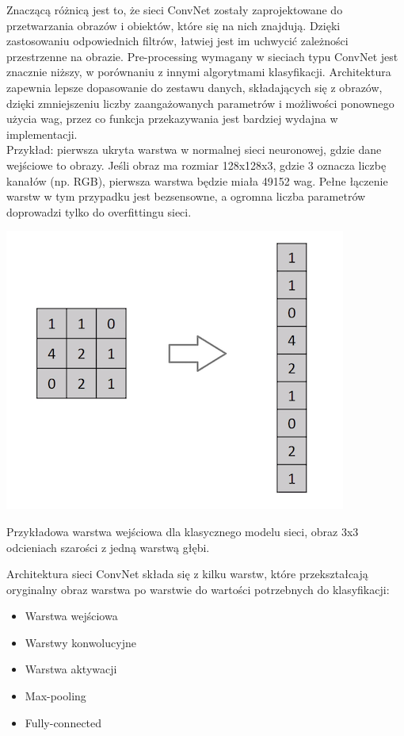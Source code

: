 \documentclass[12pt,a4paper]{article}
\begin{document}
    Znaczącą różnicą jest to, że sieci ConvNet zostały zaprojektowane do przetwarzania obrazów i obiektów, które się na nich znajdują. Dzięki zastosowaniu odpowiednich filtrów, łatwiej jest im uchwycić zależności przestrzenne na obrazie. Pre-processing wymagany w sieciach typu ConvNet jest znacznie niższy, w porównaniu z innymi algorytmami klasyfikacji. Architektura zapewnia lepsze dopasowanie do zestawu danych, składających się z obrazów, dzięki zmniejszeniu liczby zaangażowanych parametrów i możliwości ponownego użycia wag, przez co funkcja przekazywania jest bardziej wydajna w implementacji. 
    \\
    
    Przykład: pierwsza ukryta warstwa w normalnej sieci neuronowej, gdzie dane wejściowe to obrazy. Jeśli obraz ma rozmiar 128x128x3, gdzie 3 oznacza liczbę kanałów (np. RGB), pierwsza warstwa będzie miała 49152 wag. Pełne łączenie warstw w tym przypadku jest bezsensowne, a ogromna liczba parametrów doprowadzi tylko do overfittingu sieci.
    \begin{center}
        \includegraphics[scale=0.5]{input_vector.png}
        \begin{flushright}
            \begin{scriptsize}
            Przykładowa warstwa wejściowa dla klasycznego modelu sieci, obraz 3x3 odcieniach szarości z jedną warstwą głębi.
            \end{scriptsize}
        \end{flushright}
    \end{center}
    
    Architektura sieci ConvNet składa się z kilku warstw, które przekształcają oryginalny obraz warstwa po warstwie do wartości potrzebnych do klasyfikacji:
    \begin{itemize}
        \item Warstwa wejściowa
        \item Warstwy konwolucyjne
        \item Warstwa aktywacji
        \item Max-pooling
        \item Fully-connected
    \end{itemize}
\end{document}
